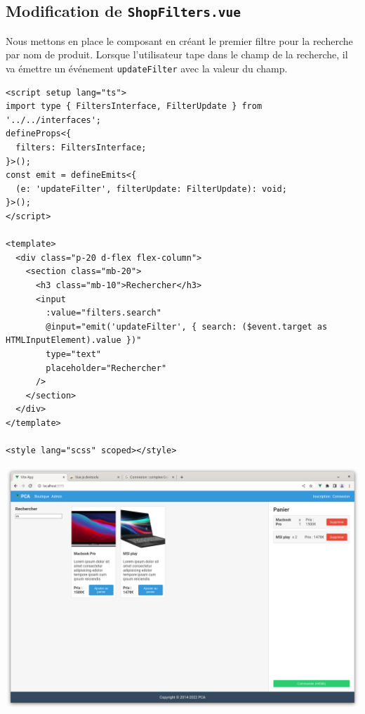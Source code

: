 \subsection{Modification de {\tt ShopFilters.vue}}
Nous mettons en place le composant en créant le premier filtre pour la recherche par nom de produit. Lorsque l'utilisateur tape dans le champ de la recherche, il va émettre un événement {\tt updateFilter} avec la valeur du champ.
\begin{verbatim}
<script setup lang="ts">
import type { FiltersInterface, FilterUpdate } from '../../interfaces';
defineProps<{
  filters: FiltersInterface;
}>();
const emit = defineEmits<{
  (e: 'updateFilter', filterUpdate: FilterUpdate): void;
}>();
</script>

<template>
  <div class="p-20 d-flex flex-column">
    <section class="mb-20">
      <h3 class="mb-10">Rechercher</h3>
      <input
        :value="filters.search"
        @input="emit('updateFilter', { search: ($event.target as HTMLInputElement).value })"
        type="text"
        placeholder="Rechercher"
      />
    </section>
  </div>
</template>

<style lang="scss" scoped></style>
\end{verbatim}


\begin{center}
\includegraphics[width=15cm]{images/image25.png}
\end{center}

